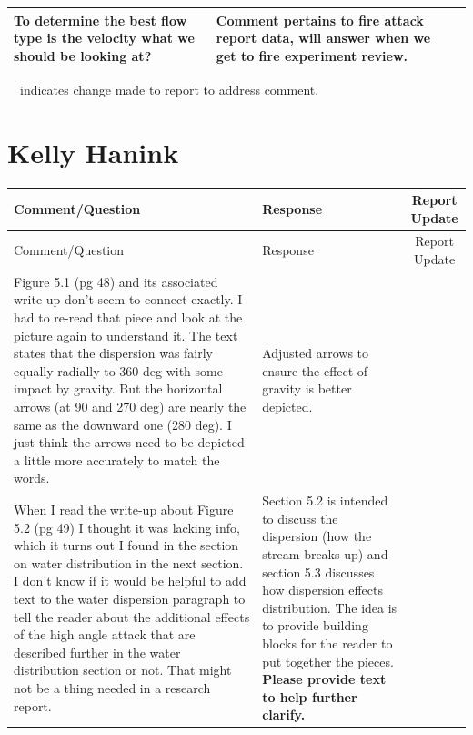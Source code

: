 \documentclass[12pt,oneside]{book}
\begin{document}
\begin{landscape}
\begin{longtable}{|L{4in}|L{3.75in}|c|}
		\hline
		To determine the best flow type is the velocity what we should be looking at? & 
		Comment pertains to fire attack report data, will answer when we get to fire experiment review. & \\

		\hline
\end{longtable}
\checkmark~~indicates change made to report to address comment.

\newpage

\section{Kelly Hanink}
\begin{longtable}{|L{4in}|L{3.75in}|c|}

		\hline
		Comment/Question & Response & Report Update \\ 
		\toprule[1.0pt] \endfirsthead
		\hline
		Comment/Question & Response & Report Update \\ 
		\toprule[1.0pt] \endhead
		\hline

		\hline
		Figure 5.1 (pg 48) and its associated write-up don't seem to connect exactly. I had to re-read that piece and look at the picture again to understand it. The text states that the dispersion was fairly equally radially to 360 deg with some impact by gravity. But the horizontal arrows (at 90 and 270 deg) are nearly the same as the downward one (280 deg). I just think the arrows need to be depicted a little more accurately to match the words. & 
		Adjusted arrows to ensure the effect of gravity is better depicted. & \checkmark \\  

		\hline
		When I read the write-up about Figure 5.2 (pg 49) I thought it was lacking info, which it turns out I found in the section on water distribution in the next section. I don't know if it would be helpful to add text to the water dispersion paragraph to tell the reader about the additional effects of the high angle attack that are described further in the water distribution section or not. That might not be a thing needed in a research report. & 
		Section 5.2 is intended to discuss the dispersion (how the stream breaks up) and section 5.3 discusses how dispersion effects distribution. The idea is to provide building blocks for the reader to put together the pieces. \textbf{Please provide text to help further clarify.} & \\


\end{longtable}
\end{landscape}
\end{document}
